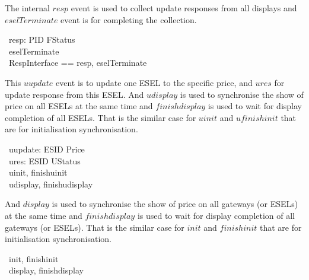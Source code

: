 The internal $resp$ event is used to collect update responses from all displays and $eselTerminate$ event is for completing the collection.
\begin{circus}
	\circchannel\ resp: PID \cross FStatus \\
    \circchannel\ eselTerminate \\
    \circchannelset\ RespInterface == \lchanset resp, eselTerminate \rchanset
\end{circus}

%

This $uupdate$ event is to update one ESEL to the specific price, and $ures$ for update response from this ESEL.
And $udisplay$ is used to synchronise the show of price on all ESELs at the same time and $finishdisplay$ is used to wait for display completion of all ESELs. That is the similar case for $uinit$ and $ufinishinit$ that are for initialisation synchronisation.
\begin{circus}
	\circchannel\ uupdate: ESID \cross Price \\
	\circchannel\ ures: ESID \cross UStatus \\
	\circchannel\ uinit, finishuinit\\
	\circchannel\ udisplay, finishudisplay
\end{circus}

And $display$ is used to synchronise the show of price on all gateways (or ESELs) at the same time and $finishdisplay$ is used to wait for display completion of all gateways (or ESELs). That is the similar case for $init$ and $finishinit$ that are for initialisation synchronisation.
\begin{circus}
	\circchannel\ init, finishinit \\
	\circchannel\ display, finishdisplay
\end{circus}

